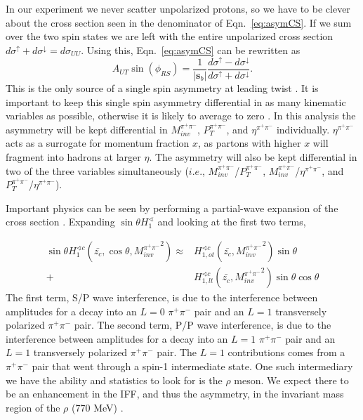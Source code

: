 \documentclass[letterpaper, abstract = on,listof=totoc, bibliography=totoc]{scrreprt}
\newcommand{\phirs}{\phi_{RS}}
\newcommand{\ptpair}{P_{T}^{\pi^+\pi^-}}
\newcommand{\mpair}{M_{inv}^{\pi^+\pi^-}}
\newcommand{\etapair}{\eta^{\pi^+\pi^-}}
\newcommand{\pip}{\pi^+}
\newcommand{\pim}{\pi^-}
\newcommand{\pair}{$\pip\pim$ }
\begin{document}
In our experiment we never scatter unpolarized protons, so we have to be clever about the cross section seen in the denominator of Eqn.~\ref{eq:asymCS}. If we sum over the two spin states we are left with the entire unpolarized cross section $d\sigma^\uparrow + d\sigma^\downarrow = d\sigma_{UU}$. Using this, Eqn.~\ref{eq:asymCS} can be rewritten as \cite{bacchettaRadici2, BacchettaThesis, PhysRevLett.80.1166} 
\begin{equation}
\label{eq:SSA}
A_{UT} \sin (\phirs) =\frac{1}{|\bm{s}_b|} \frac{d\sigma^\uparrow - d\sigma^\downarrow}{d\sigma^\uparrow + d\sigma^\downarrow}.
\end{equation}
This is the only source of a single spin asymmetry at leading twist \cite{bacchettaRadici2}. It is important to keep this single spin asymmetry differential in as many kinematic variables as possible, otherwise it is likely to average to zero \cite{keepDifferential}. In this analysis the asymmetry will be kept differential in $\mpair$, $\ptpair$, and $\etapair$ individually. $\etapair$ acts as a surrogate for momentum fraction $x$, as partons with higher $x$ will fragment into hadrons at larger $\eta$. The asymmetry will also be kept differential in two of the three variables simultaneously ($i.e.$, $\mpair$/$\ptpair$, $\mpair$/$\etapair$, and $\ptpair$/$\etapair$). 

Important physics can be seen by performing a partial-wave expansion of the cross section \cite{partialWave}. Expanding $\sin \theta H_1^\sphericalangle$ and looking at the first two terms, 


\begin{align}
\label{eq:partialwaveexpansion}
\sin \theta H_1^{\sphericalangle c} (\bar{z_c},\cos \theta, {\mpair}^2) \approx &H^{\sphericalangle c}_{1,ot}(\bar{z_c},{\mpair}^2) \sin\theta \nonumber \\
+ &H^{\sphericalangle c}_{1,lt}(\bar{z_c},{\mpair}^2) \sin\theta \cos\theta
\end{align}
%
The first term, S/P wave interference, is due to the interference between amplitudes for a decay into an $L = 0$  \pair pair and an $L = 1$ transversely polarized \pair pair. The second term, P/P wave interference, is due to the interference between amplitudes for a decay into an $L = 1$ \pair pair and an $L = 1$ transversely polarized \pair pair. The $L=1$ contributions comes from a \pair pair that went through a spin-1 intermediate state. One such intermediary we have the ability and statistics to look for is the $\rho$ meson. We expect there to be an enhancement in the IFF, and thus the asymmetry, in the invariant mass region of the $\rho$ (770 MeV) \cite{bacchettaRadici2, Tang}.    
\end{document}
